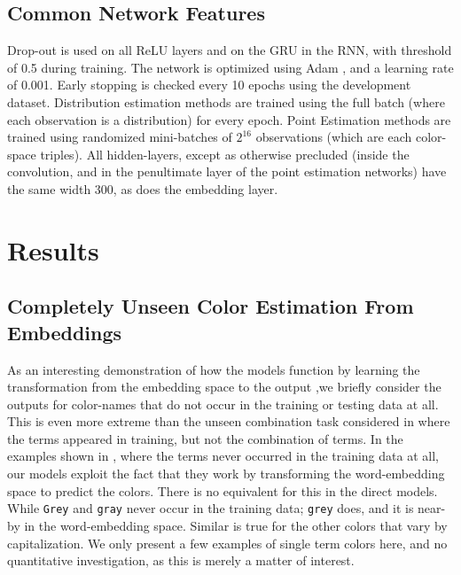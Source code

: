 \documentclass[]{clv3}
\newcommand{\parencite}{\citep}
\newcommand{\natlang}[1]{\texttt{#1}}
\begin{document}
\subsection{Common Network Features}
Drop-out\parencite{srivastava2014dropout}  is used on all ReLU layers and on the GRU in the RNN, with threshold of 0.5 during training.
The network is optimized using Adam \parencite{kingma2014adam}, and a learning rate of 0.001.
Early stopping is checked every 10 epochs using the development dataset.
Distribution estimation methods are trained using the full batch (where each observation is a distribution) for every epoch.
Point Estimation methods are trained using randomized mini-batches of $2^{16}$ observations (which are each color-space triples).
All hidden-layers, except as otherwise precluded (inside the convolution, and in the penultimate layer of the point estimation networks) have the same width 300, as does the embedding layer.



\section{Results}\label{sec:results}






\subsection{Completely Unseen Color Estimation From Embeddings}\label{sec:embeddingonly}
As an interesting demonstration of how the models function by learning the transformation from the embedding space to the output ,we briefly consider the outputs for color-names that do not occur in the training or testing data at all.
This is even more extreme than the unseen combination task considered in  where the terms appeared in training, but not the combination of terms.
In the examples shown in , where the terms never occurred in the training data at all, our models exploit the fact that they work by transforming the word-embedding space to predict the colors.
There is no equivalent for this in the direct models.
While \natlang{Grey} and \natlang{gray} never occur in the training data; \natlang{grey} does, and it is near-by in the word-embedding space.
Similar is true for the other colors that vary by capitalization.
We only present a few examples of single term colors here, and no quantitative investigation, as this is merely a matter of interest.
\end{document}
